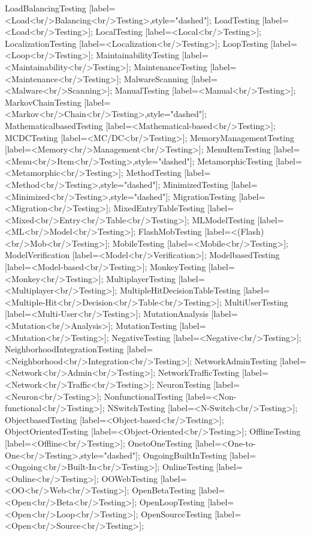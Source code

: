 \documentclass{article}
\begin{document}
{LoadBalancingTesting [label=<Load<br/>Balancing<br/>Testing>,style="dashed"];
LoadTesting [label=<Load<br/>Testing>];
LocalTesting [label=<Local<br/>Testing>];
LocalizationTesting [label=<Localization<br/>Testing>];
LoopTesting [label=<Loop<br/>Testing>];
MaintainabilityTesting [label=<Maintainability<br/>Testing>];
MaintenanceTesting [label=<Maintenance<br/>Testing>];
MalwareScanning [label=<Malware<br/>Scanning>];
ManualTesting [label=<Manual<br/>Testing>];
MarkovChainTesting [label=<Markov<br/>Chain<br/>Testing>,style="dashed"];
MathematicalbasedTesting [label=<Mathematical-based<br/>Testing>];
MCDCTesting [label=<MC/DC<br/>Testing>];
MemoryManagementTesting [label=<Memory<br/>Management<br/>Testing>];
MenuItemTesting [label=<Menu<br/>Item<br/>Testing>,style="dashed"];
MetamorphicTesting [label=<Metamorphic<br/>Testing>];
MethodTesting [label=<Method<br/>Testing>,style="dashed"];
MinimizedTesting [label=<Minimized<br/>Testing>,style="dashed"];
MigrationTesting [label=<Migration<br/>Testing>];
MixedEntryTableTesting [label=<Mixed<br/>Entry<br/>Table<br/>Testing>];
MLModelTesting [label=<ML<br/>Model<br/>Testing>];
FlashMobTesting [label=<(Flash)<br/>Mob<br/>Testing>];
MobileTesting [label=<Mobile<br/>Testing>];
ModelVerification [label=<Model<br/>Verification>];
ModelbasedTesting [label=<Model-based<br/>Testing>];
MonkeyTesting [label=<Monkey<br/>Testing>];
MultiplayerTesting [label=<Multiplayer<br/>Testing>];
MultipleHitDecisionTableTesting [label=<Multiple-Hit<br/>Decision<br/>Table<br/>Testing>];
MultiUserTesting [label=<Multi-User<br/>Testing>];
MutationAnalysis [label=<Mutation<br/>Analysis>];
MutationTesting [label=<Mutation<br/>Testing>];
NegativeTesting [label=<Negative<br/>Testing>];
NeighborhoodIntegrationTesting [label=<Neighborhood<br/>Integration<br/>Testing>];
NetworkAdminTesting [label=<Network<br/>Admin<br/>Testing>];
NetworkTrafficTesting [label=<Network<br/>Traffic<br/>Testing>];
NeuronTesting [label=<Neuron<br/>Testing>];
NonfunctionalTesting [label=<Non-functional<br/>Testing>];
NSwitchTesting [label=<N-Switch<br/>Testing>];
ObjectbasedTesting [label=<Object-based<br/>Testing>];
ObjectOrientedTesting [label=<Object-Oriented<br/>Testing>];
OfflineTesting [label=<Offline<br/>Testing>];
OnetoOneTesting [label=<One-to-One<br/>Testing>,style="dashed"];
OngoingBuiltInTesting [label=<Ongoing<br/>Built-In<br/>Testing>];
OnlineTesting [label=<Online<br/>Testing>];
OOWebTesting [label=<OO<br/>Web<br/>Testing>];
OpenBetaTesting [label=<Open<br/>Beta<br/>Testing>];
OpenLoopTesting [label=<Open<br/>Loop<br/>Testing>];
OpenSourceTesting [label=<Open<br/>Source<br/>Testing>];
}
\end{document}
